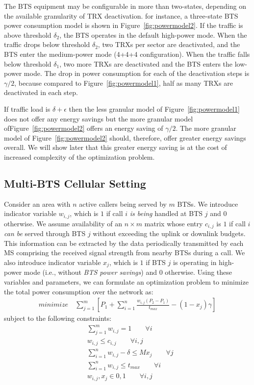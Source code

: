 The BTS equipment may be configurable in more than two-states, depending on the available granularity of TRX deactivation. for instance, a three-state BTS power consumption model is shown in Figure~\ref{fig:powermodel2}. If the traffic is above threshold $\delta_2$, the BTS operates in the default high-power mode. When the traffic drops below threshold $\delta_2$, two TRXs per sector are deactivated, and the BTS enter the medium-power mode (4+4+4 configuration). When the traffic falls below threshold $\delta_1$, two more TRXs are deactivated and the BTS enters the low-power mode. The drop in power consumption for each of the deactivation steps is $\gamma/2$, because compared to Figure~\ref{fig:powermodel1}, half as many TRXs are deactivated in each step.

If traffic load is $\delta + \epsilon$ then the less granular model of Figure~\ref{fig:powermodel1} does not offer any energy savings but the more granular model ofFigure~\ref{fig:powermodel2} offers an energy saving of $\gamma/2$. The more granular model of Figure~\ref{fig:powermodel2} should, therefore, offer greater energy savings overall. We will show later that this greater energy saving is at the cost of increased complexity of the optimization problem.  

\subsection{Multi-BTS Cellular Setting}
Consider an area with $n$ active callers being served by $m$ BTSs.
We introduce indicator variable $w_{i,j}$, which is $1$ if call
$i$ \textit{is being} handled at BTS $j$ and $0$ otherwise. We
assume availability of an $n\times m$ matrix whose entry
$c_{i,j}$ is $1$ if call $i$ \textit{can be} served through
BTS $j$ without exceeding the uplink or downlink budgets.
This information can be extracted by the data periodically
transmitted by each MS comprising the received signal strength
from nearby BTSs during a call. We also introduce indicator
variable $x_j$, which is $1$ if BTS $j$ is operating in
high-power mode (i.e., without \textit{BTS power savings}) and
$0$ otherwise. Using these variables and parameters, we can
formulate an optimization problem to minimize the total power
consumption over the network as:
\begin{align}
\textit{minimize} \quad \sum_{j=1}^{m} \left[
P_1+\sum_{i=1}^{n}\frac{w_{i,j}(P_2-P_1)}{t_{max}}-(1-x_j)\gamma
\right]
\end{align}
subject to the following constraints:
\begin{align}
& \sum_{j=1}^m w_{i,j} = 1 \qquad \forall i \\
& w_{i,j} \leq c_{i,j} \qquad \forall i, j \\
& \sum_{i=1}^nw_{i,j}-\delta \leq Mx_j \qquad \forall j\\
& \sum_{i=1}^n w_{i,j} \le t_{max} \qquad \forall i \\
& w_{i,j}, x_j \in {0,1} \qquad \forall i, j%
\end{align}

